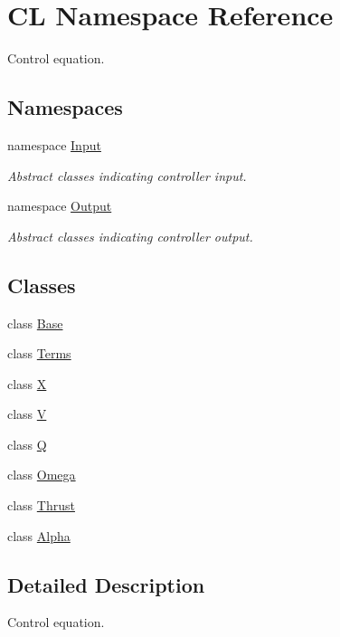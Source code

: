 \hypertarget{namespaceCL}{\section{\-C\-L \-Namespace \-Reference}
\label{namespaceCL}
}


\-Control equation.  


\subsection*{\-Namespaces}
\begin{DoxyCompactItemize}
\item 
namespace \hyperlink{namespaceCL_1_1Input}{\-Input}
\begin{DoxyCompactList}\small\item\em \-Abstract classes indicating controller input. \end{DoxyCompactList}\item 
namespace \hyperlink{namespaceCL_1_1Output}{\-Output}
\begin{DoxyCompactList}\small\item\em \-Abstract classes indicating controller output. \end{DoxyCompactList}\end{DoxyCompactItemize}
\subsection*{\-Classes}
\begin{DoxyCompactItemize}
\item 
class \hyperlink{classCL_1_1Base}{\-Base}
\item 
class \hyperlink{classCL_1_1Terms}{\-Terms}
\item 
class \hyperlink{classCL_1_1X}{\-X}
\item 
class \hyperlink{classCL_1_1V}{\-V}
\item 
class \hyperlink{classCL_1_1Q}{\-Q}
\item 
class \hyperlink{classCL_1_1Omega}{\-Omega}
\item 
class \hyperlink{classCL_1_1Thrust}{\-Thrust}
\item 
class \hyperlink{classCL_1_1Alpha}{\-Alpha}
\end{DoxyCompactItemize}


\subsection{\-Detailed \-Description}
\-Control equation. 